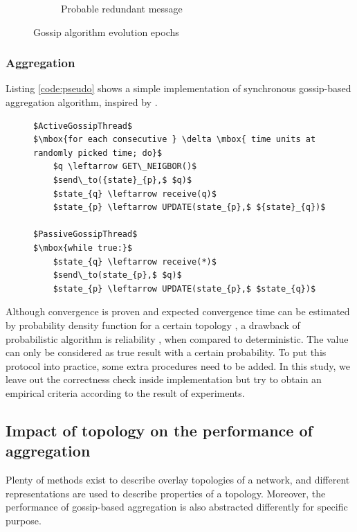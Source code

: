 \begin{figure}[h!]
\begin{center}
\begin{subfigure}[c]{0.45\textwidth}
      \caption{Probable redundant message}
   	\end{subfigure}
   \end{center}
   \caption{Gossip algorithm evolution epochs}
   \label{fig:epochs}
\end{figure}

\subsubsection{Aggregation}
Listing \ref{code:pseudo} shows a simple implementation of synchronous gossip-based aggregation algorithm, inspired by \cite{jelasity_gossip-based_2005}.
\begin{figure}[!h]
\begin{lstlisting}[caption={Pseudo Code for gossip-based aggregation}, label=code:pseudo, mathescape=true, captionpos=b]
$ActiveGossipThread$
$\mbox{for each consecutive } \delta \mbox{ time units at randomly picked time; do}$
    $q \leftarrow GET\_NEIGBOR()$
    $send\_to({state}_{p},$ $q)$
    $state_{q} \leftarrow receive(q)$
    $state_{p} \leftarrow UPDATE(state_{p},$ ${state}_{q})$

$PassiveGossipThread$
$\mbox{while true:}$
    $state_{q} \leftarrow receive(*)$
    $send\_to(state_{p},$ $q)$
    $state_{p} \leftarrow UPDATE(state_{p},$ $state_{q})$
\end{lstlisting}
\end{figure}

Although convergence is proven and expected convergence time can be estimated by probability density function for a certain topology \cite{5929538}, a drawback of probabilistic algorithm is reliability \cite{Lynch:1996:DA:525656}, when compared to deterministic. The value can only be considered as true result with a certain probability. To put this protocol into practice, some extra procedures need to be added. In this study, we leave out the correctness check inside implementation but try to obtain an empirical criteria according to the result of experiments.

\subsection{Impact of topology on the performance of aggregation}
Plenty of methods exist to describe overlay topologies of a network, and different representations are used to describe properties of a topology. Moreover, the performance of gossip-based aggregation is also abstracted differently for specific purpose.


